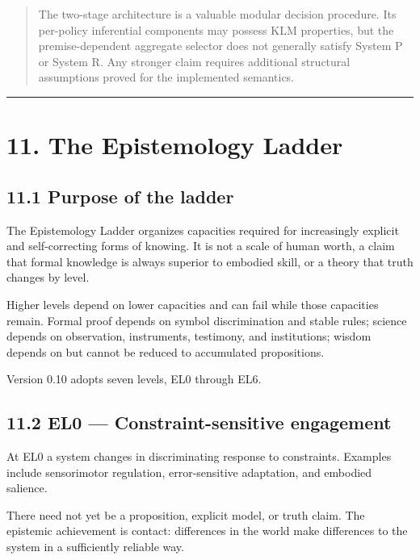 \documentclass[
  11pt,
]{article}
\begin{document}
\begin{quote}
The two-stage architecture is a valuable modular decision procedure. Its
per-policy inferential components may possess KLM properties, but the
premise-dependent aggregate selector does not generally satisfy System P
or System R. Any stronger claim requires additional structural
assumptions proved for the implemented semantics.
\end{quote}

\begin{center}\rule{0.5\linewidth}{0.5pt}\end{center}

\section{11. The Epistemology Ladder}\label{the-epistemology-ladder}

\subsection{11.1 Purpose of the ladder}\label{purpose-of-the-ladder}

The Epistemology Ladder organizes capacities required for increasingly
explicit and self-correcting forms of knowing. It is not a scale of
human worth, a claim that formal knowledge is always superior to
embodied skill, or a theory that truth changes by level.

Higher levels depend on lower capacities and can fail while those
capacities remain. Formal proof depends on symbol discrimination and
stable rules; science depends on observation, instruments, testimony,
and institutions; wisdom depends on but cannot be reduced to accumulated
propositions.

Version 0.10 adopts seven levels, EL0 through EL6.

\subsection{11.2 EL0 --- Constraint-sensitive
engagement}\label{el0-constraint-sensitive-engagement}

At EL0 a system changes in discriminating response to constraints.
Examples include sensorimotor regulation, error-sensitive adaptation,
and embodied salience.

There need not yet be a proposition, explicit model, or truth claim. The
epistemic achievement is contact: differences in the world make
differences to the system in a sufficiently reliable way.
\end{document}
